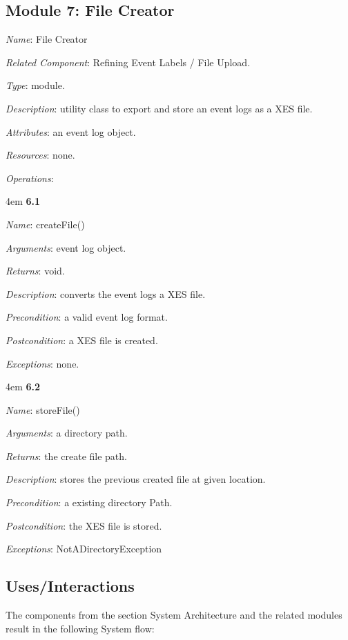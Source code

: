 \documentclass[notitlepage]{article}
\begin{document}
\begin{flushleft}
\subsection{Module 7: File Creator}
\textit{Name}: File Creator

\textit{Related Component}: Refining Event Labels / File Upload.

\textit{Type}: module.

\textit{Description}: utility class to export and store an event logs as a XES file.

\textit{Attributes}: an event log object.

\textit{Resources}: none.

\textit{Operations}: 
\medskip
\par
\begingroup
\leftskip4em
\textbf{6.1} 

\textit{Name}: createFile()

\textit{Arguments}: event log object.

\textit{Returns}: void.

\textit{Description}: converts the event logs a XES file.

\textit{Precondition}: a valid event log format.

\textit{Postcondition}: a XES file is created.

\textit{Exceptions}: none.
\par
\endgroup

\medskip
\par
\begingroup
\leftskip4em
\textbf{6.2} 

\textit{Name}: storeFile()

\textit{Arguments}: a directory path.

\textit{Returns}: the create file path.

\textit{Description}: stores the previous created file at given location.

\textit{Precondition}: a existing directory Path.

\textit{Postcondition}: the XES file is stored.

\textit{Exceptions}: NotADirectoryException
\par
\endgroup

\subsection{Uses/Interactions}
The components from the section System Architecture and the related modules result in the following System flow:\\


\end{flushleft}
\end{document}
